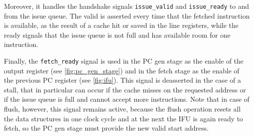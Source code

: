 Moreover, it handles the handshake signals \texttt{issue\_valid} and \texttt{issue\_ready} to and from the issue queue. The valid is asserted every time that the fetched instruction is available, as the result of a cache hit or saved in the line registers, while the ready signals that the issue queue is not full and has available room for one instruction. 

Finally, the \texttt{fetch\_ready} signal is used in the \ac{PC} gen stage as the enable of the output register (see \cref{fig:pc_gen_stage}) and in the fetch stage as the enable of the previous \ac{PC} register (see \cref{fig:ifu}). This signal is deasserted in the case of a stall, that in particular can occur if the cache misses on the requested address or if the issue queue is full and cannot accept more instructions. Note that in case of flush, however, this signal remains active, because the flush operation resets all the data structures in one clock cycle and at the next the \ac{IFU} is again ready to fetch, so the \ac{PC} gen stage must provide the new valid start address.

